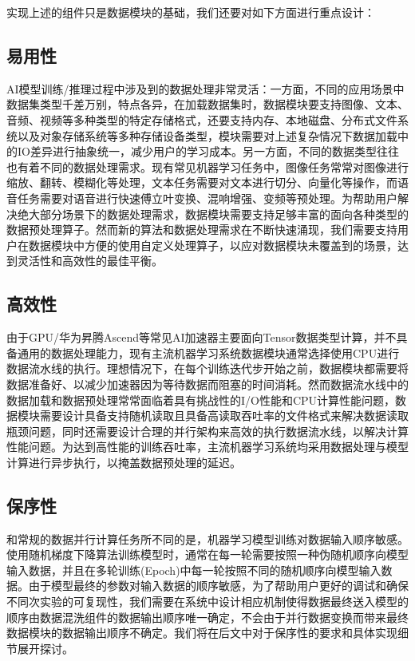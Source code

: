 \documentclass[letterpaper,10pt,english]{sphinxmanual}
\begin{document}
\sphinxAtStartPar
实现上述的组件只是数据模块的基础，我们还要对如下方面进行重点设计：


\subsection{易用性}
\label{\detokenize{chapter_data_processing/requirements:id2}}
\sphinxAtStartPar
AI模型训练/推理过程中涉及到的数据处理非常灵活：一方面，不同的应用场景中数据集类型千差万别，特点各异，在加载数据集时，数据模块要支持图像、文本、音频、视频等多种类型的特定存储格式，还要支持内存、本地磁盘、分布式文件系统以及对象存储系统等多种存储设备类型，模块需要对上述复杂情况下数据加载中的IO差异进行抽象统一，减少用户的学习成本。另一方面，不同的数据类型往往也有着不同的数据处理需求。现有常见机器学习任务中，图像任务常常对图像进行缩放、翻转、模糊化等处理，文本任务需要对文本进行切分、向量化等操作，而语音任务需要对语音进行快速傅立叶变换、混响增强、变频等预处理。为帮助用户解决绝大部分场景下的数据处理需求，数据模块需要支持足够丰富的面向各种类型的数据预处理算子。然而新的算法和数据处理需求在不断快速涌现，我们需要支持用户在数据模块中方便的使用自定义处理算子，以应对数据模块未覆盖到的场景，达到灵活性和高效性的最佳平衡。


\subsection{高效性}
\label{\detokenize{chapter_data_processing/requirements:id3}}
\sphinxAtStartPar
由于GPU/华为昇腾Ascend等常见AI加速器主要面向Tensor数据类型计算，并不具备通用的数据处理能力，现有主流机器学习系统数据模块通常选择使用CPU进行数据流水线的执行。理想情况下，在每个训练迭代步开始之前，数据模块都需要将数据准备好、以减少加速器因为等待数据而阻塞的时间消耗。然而数据流水线中的数据加载和数据预处理常常面临着具有挑战性的I/O性能和CPU计算性能问题，数据模块需要设计具备支持随机读取且具备高读取吞吐率的文件格式来解决数据读取瓶颈问题，同时还需要设计合理的并行架构来高效的执行数据流水线，以解决计算性能问题。为达到高性能的训练吞吐率，主流机器学习系统均采用数据处理与模型计算进行异步执行，以掩盖数据预处理的延迟。


\subsection{保序性}
\label{\detokenize{chapter_data_processing/requirements:id4}}
\sphinxAtStartPar
和常规的数据并行计算任务所不同的是，机器学习模型训练对数据输入顺序敏感。使用随机梯度下降算法训练模型时，通常在每一轮需要按照一种伪随机顺序向模型输入数据，并且在多轮训练(Epoch)中每一轮按照不同的随机顺序向模型输入数据。由于模型最终的参数对输入数据的顺序敏感，为了帮助用户更好的调试和确保不同次实验的可复现性，我们需要在系统中设计相应机制使得数据最终送入模型的顺序由数据混洗组件的数据输出顺序唯一确定，不会由于并行数据变换而带来最终数据模块的数据输出顺序不确定。我们将在后文中对于保序性的要求和具体实现细节展开探讨。
\end{document}
